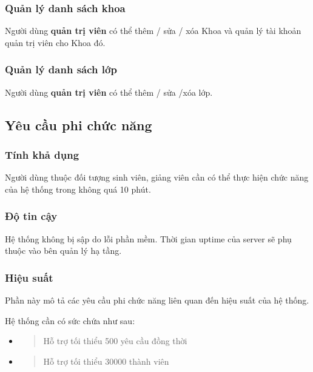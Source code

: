 \documentclass[./../main.tex]{subfiles}
\begin{document}
\hypertarget{quux1ea3n-luxfd-danh-suxe1ch-khoa}{%
	\subsubsection{Quản lý danh sách
		khoa}\label{quux1ea3n-luxfd-danh-suxe1ch-khoa}}
  
Người dùng \textbf{quản trị viên} có thể thêm / sửa / xóa Khoa và quản
lý tài khoản quản trị viên cho Khoa đó.
  
\hypertarget{quux1ea3n-luxfd-danh-suxe1ch-lux1edbp}{%
	\subsubsection{Quản lý danh sách
		lớp}\label{quux1ea3n-luxfd-danh-suxe1ch-lux1edbp}}
  
Người dùng \textbf{quản trị viên} có thể thêm / sửa /xóa lớp.

\subsection{Yêu cầu phi chức năng}

\hypertarget{tuxednh-khux1ea3-dux1ee5ng}{%
	\subsubsection{Tính khả dụng}\label{tuxednh-khux1ea3-dux1ee5ng}}

Người dùng thuộc đối tượng sinh viên, giảng viên cần có thể thực hiện
chức năng của hệ thống trong không quá 10 phút.

\hypertarget{ux111ux1ed9-tin-cux1eady}{%
	\subsubsection{Độ tin cậy}\label{ux111ux1ed9-tin-cux1eady}}

Hệ thống không bị sập do lỗi phần mềm. Thời gian uptime của server sẽ
phụ thuộc vào bên quản lý hạ tầng.

\hypertarget{hiux1ec7u-suux1ea5t}{%
	\subsubsection{Hiệu suất}\label{hiux1ec7u-suux1ea5t}}

Phần này mô tả các yêu cầu phi chức năng liên quan đến hiệu suất của hệ
thống.

Hệ thống cần có sức chứa như sau:

\begin{itemize}
	\item
	      \begin{quote}
	      	Hỗ trợ tối thiểu 500 yêu cầu đồng thời
	      \end{quote}
	\item
	      \begin{quote}
	      	Hỗ trợ tối thiểu 30000 thành viên
	      \end{quote}
\end{itemize}
\end{document}
